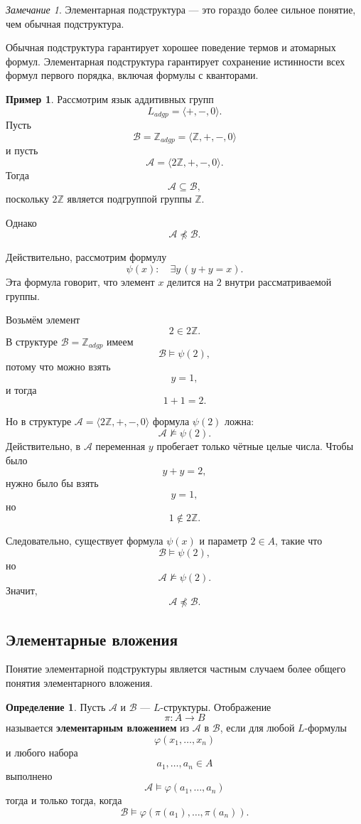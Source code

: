 \documentclass[12pt,a4paper,oneside,openany]{book}
\theoremstyle{definition}
\newtheorem{definition}{Определение}[chapter]
\newtheorem{example}{Пример}[chapter]
\theoremstyle{plain}
\theoremstyle{remark}
\newtheorem{remark}{Замечание}[chapter]
\begin{document}
\begin{remark}
Элементарная подструктура — это гораздо более сильное понятие, чем обычная подструктура.

Обычная подструктура гарантирует хорошее поведение термов и атомарных формул. Элементарная подструктура гарантирует сохранение истинности всех формул первого порядка, включая формулы с кванторами.
\end{remark}

\begin{example}
Рассмотрим язык аддитивных групп
\[
L_{adgp}=\langle +,-,0\rangle.
\]
Пусть
\[
\mathcal B=\mathbb Z_{adgp}
=
\langle \mathbb Z,+,-,0\rangle
\]
и пусть
\[
\mathcal A=\langle 2\mathbb Z,+,-,0\rangle.
\]
Тогда
\[
\mathcal A\subseteq \mathcal B,
\]
поскольку $2\mathbb Z$ является подгруппой группы $\mathbb Z$.

Однако
\[
\mathcal A\not\preccurlyeq \mathcal B.
\]

Действительно, рассмотрим формулу
\[
\psi(x):\quad \exists y\,(y+y=x).
\]
Эта формула говорит, что элемент $x$ делится на $2$ внутри рассматриваемой группы.

Возьмём элемент
\[
2\in 2\mathbb Z.
\]
В структуре $\mathcal B=\mathbb Z_{adgp}$ имеем
\[
\mathcal B\models \psi(2),
\]
потому что можно взять
\[
y=1,
\]
и тогда
\[
1+1=2.
\]

Но в структуре $\mathcal A=\langle 2\mathbb Z,+,-,0\rangle$ формула $\psi(2)$ ложна:
\[
\mathcal A\not\models \psi(2).
\]
Действительно, в $\mathcal A$ переменная $y$ пробегает только чётные целые числа. Чтобы было
\[
y+y=2,
\]
нужно было бы взять
\[
y=1,
\]
но
\[
1\notin 2\mathbb Z.
\]

Следовательно, существует формула $\psi(x)$ и параметр $2\in A$, такие что
\[
\mathcal B\models\psi(2),
\]
но
\[
\mathcal A\not\models\psi(2).
\]
Значит,
\[
\mathcal A\not\preccurlyeq\mathcal B.
\]
\end{example}

\subsection{Элементарные вложения}

Понятие элементарной подструктуры является частным случаем более общего понятия элементарного вложения.

\begin{definition}
Пусть $\mathcal A$ и $\mathcal B$ — $L$-структуры. Отображение
\[
\pi:A\to B
\]
называется \textbf{элементарным вложением} из $\mathcal A$ в $\mathcal B$, если для любой $L$-формулы
\[
\varphi(x_1,\ldots,x_n)
\]
и любого набора
\[
a_1,\ldots,a_n\in A
\]
выполнено
\[
\mathcal A\models\varphi(a_1,\ldots,a_n)
\]
тогда и только тогда, когда
\[
\mathcal B\models\varphi(\pi(a_1),\ldots,\pi(a_n)).
\]
\end{definition}
\end{document}
